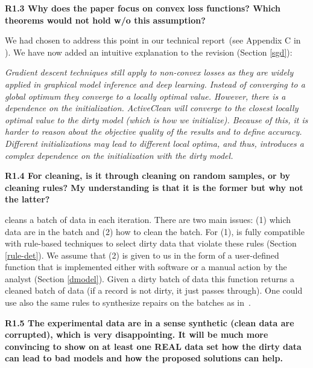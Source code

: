 \vspace{0.5em}

\noindent\textbf{R1.3 Why does the paper focus on convex loss functions? Which theorems would not hold w/o this assumption?}

\noindent We had chosen to address this point in our technical report~(see Appendix C in \cite{activecleanarxiv}). We have now added an intuitive explanation to the revision (Section \ref{sgd}):

\emph{Gradient descent techniques still apply to non-convex losses as they are widely applied in graphical model inference and deep learning. Instead of converging to a global optimum
they converge to a locally optimal value. However, there is a dependence on the initialization.
ActiveClean will converge to the closest locally optimal value to
the dirty model (which is how we initialize). Because of this, it is harder to reason about
the objective quality of the results and to define accuracy.
 Different initializations may lead to different local
optima, and thus, introduces a complex dependence on the
initialization with the dirty model.}

\vspace{0.5em}

\noindent\textbf{R1.4 For cleaning, is it through cleaning on random samples, or by cleaning rules? My understanding is that it is the former but why not the latter?}

\noindent \sys cleans a batch of data in each iteration. 
There are two main issues: (1) which data are in the batch and (2) how to clean the batch. 
For (1), \sys is fully compatible with rule-based techniques to select dirty data that violate these rules (Section \ref{rule-det}).
We assume that (2) is given to us in the form of a user-defined function that is implemented either with software or a manual action by the analyst (Section \ref{dmodel}). 
Given a dirty batch of data this function returns a cleaned batch of data (if a record is not dirty, it just passes through).
One could use also the same rules to synthesize repairs on the batches as in~\cite{DBLP:journals/pvldb/YakoutENOI11}.

\vspace{0.5em}

\noindent\textbf{R1.5 The experimental data are in a sense synthetic (clean data are corrupted), which is very disappointing. It will be much more convincing to show on at least one REAL data set how the dirty data can lead to bad models and how the proposed solutions can help.}

